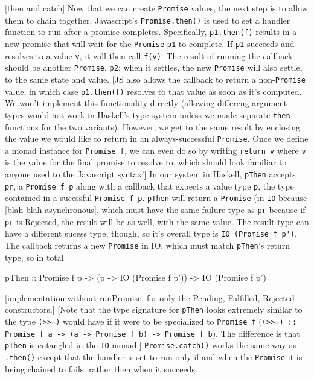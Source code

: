 \documentclass[sigplan,screen]{acmart}
\newcommand{\lit}[1]{\lstinline{#1}}
\begin{document}
[then and catch]
Now that we can create \lit{Promise} values, the next step is to allow them to chain together.  Javascript's \lit{Promise.then()} is used to set a handler function to run after a promise completes.  Specifically, \lit{p1.then(f)} results in a new promise that will wait for the \lit{Promise} \lit{p1} to complete.  If \lit{p1} succeeds and resolves to a value \lit v, it will then call \lit{f(v)}.  The result of running the callback should be another \lit{Promise}, \lit{p2}; when it settles, the new \lit{Promise} will also settle, to the same state and value.
[JS also allows the callback to return a non-\lit{Promise} value, in which case \lit{p1.then(f)} resolves to that value as soon as it's computed.  We won't implement this functionality directly
(allowing differeng argument types would not work in Haskell's type system unless we made separate \lit{then} functions for the two variants).  However, we get to the same result by enclosing the value we would like to return in an always-successful \lit{Promise}.  Once we define a monad instance for \lit{Promise f}, we can even do so by writing \lit{return v} where \lit{v} is the value for the final promise to resolve to, which should look familiar to anyone used to the Javascript syntax!]
In our system in Haskell, \lit{pThen} accepts \lit{pr}, a \lit{Promise f p} along with a callback that expects a value type \lit p, the type contained in a sucessful \lit{Promise f p}.  \lit{pThen} will return a \lit{Promise} (in \lit{IO} because [blah blah asynchronous], which must have the same failure type as \lit{pr} because if \lit{pr} is Rejected, the result will be as well, with the same value.  The result type can have a different sucess type, though, so it's overall type is \lit{IO (Promise f p')}.  The callback returns a new \lit{Promise} in IO, which must match \lit{pThen}'s return type, so in total
\begin{code}
pThen :: Promise f p
        -> (p -> IO (Promise f p'))
        -> IO (Promise f p')
      \end{code}
[implementation without runPromise, for only the Pending, Fulfilled, Rejected constructors.]
 [Note that the type signature for \lit{pThen} looks extremely similar to the type \lit{(>>=)} would have if it were to be specialized to \lit{Promise f} (\lit{(>>=) :: Promise f a -> (a -> Promise f b) -> Promise f b}).  The difference is that \lit{pThen} is entangled in the \lit{IO} monad.]
\lit{Promise.catch()} works the same way as \lit{.then()} except that the handler is set to run only if and when the \lit{Promise} it is being chained to fails, rather then when it succeeds.  
\end{document}
